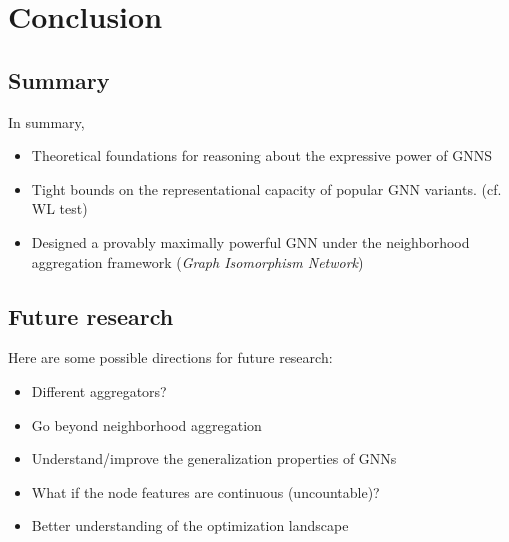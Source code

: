 \chapter{Conclusion}

\section{Summary}

In summary,

\begin{itemize}
	\item Theoretical foundations for reasoning about the expressive power of GNNS

	\item Tight bounds on the representational capacity of popular GNN variants. (cf. WL test)

	\item Designed a provably maximally powerful GNN under the neighborhood aggregation framework ({\it Graph Isomorphism Network})
	
\end{itemize}

\section{Future research}

Here are some possible directions for future research:

\begin{itemize}
	\item Different aggregators?
	\item Go beyond neighborhood aggregation
	\item Understand/improve the generalization properties of GNNs
	\item What if the node features are continuous (uncountable)?
	\item Better understanding of the optimization landscape
\end{itemize}